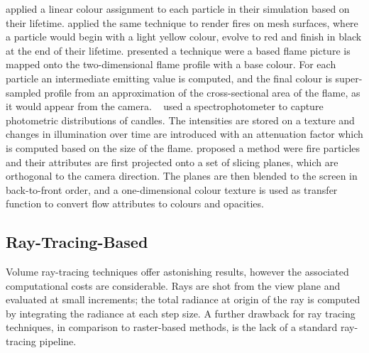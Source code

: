\cite{Reeves:1983} applied a linear colour assignment to each particle in their simulation based on their lifetime.
\cite{Lee:2001} applied the same technique to render fires on mesh surfaces, where a particle would begin with a light yellow colour, evolve to red and finish in black at the end of their lifetime.
\cite{Lamorlette:2002} presented a technique were a based flame picture is mapped onto the two-dimensional flame profile with a base colour.
For each particle an intermediate emitting value is computed, and the final colour is super-sampled profile from an approximation of the cross-sectional area of the flame, as it would appear from the camera.
~\cite{Bridault:2006} used a spectrophotometer to capture photometric distributions of candles.
The intensities are stored on a texture and changes in illumination over time are introduced with an attenuation factor which is computed based on the size of the flame.
\cite{Zhang:2011} proposed a method were fire particles and their attributes are first projected onto a set of slicing planes, which are orthogonal to the camera direction. 
The planes are then blended to the screen in back-to-front order, and a one-dimensional colour texture is used as transfer function to convert flow attributes to colours and opacities.


\subsection{Ray-Tracing-Based}
\label{sec:ray_tracing_based}

Volume ray-tracing techniques offer astonishing results, however the associated computational costs are considerable.
Rays are shot from the view plane and evaluated at small increments; the total radiance at origin of the ray is computed by integrating the radiance at each step size.
A further drawback for ray tracing techniques, in comparison to raster-based methods, is the lack of a standard ray-tracing pipeline.

